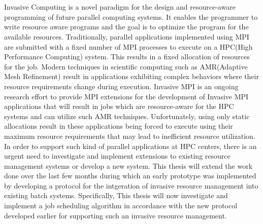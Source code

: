 \chapter{\abstractname}
Invasive Computing is a novel paradigm for the design and resource-aware programming of future parallel computing systems. It enables the programmer to write resource aware programs and the goal is to optimize the program for the available resources. Traditionally, parallel applications implemented using MPI are submitted with a fixed number of MPI processes to execute on a HPC(High Performance Computing) system. This results in a fixed allocation of resources for the job. Modern techniques in scientific computing such as AMR(Adaptive Mesh Refinement) result in applications exhibiting complex behaviors where their resource requirements change during execution. Invasive MPI is an ongoing research effort to provide MPI extensions for the development of Invasive MPI applications that will result in jobs which are resource-aware for the HPC systems and can utilize such AMR techniques. Unfortunately, using only static allocations result in these applications being forced to execute using their maximum resource requirements that may lead to inefficient resource utilization. In order to support such kind of parallel applications at HPC centers, there is an urgent need to investigate and implement extensions to existing resource management systems or develop a new system. This thesis will extend the work done over the last few months during which an early prototype was implemented by developing a protocol for the intgeration of invasive resource management into existing batch systems. Specifically, This thesis will now investigate and implement a job scheduling algorithm in accordance with the new protocol developed earlier for supporting such an invasive resource management.\par



